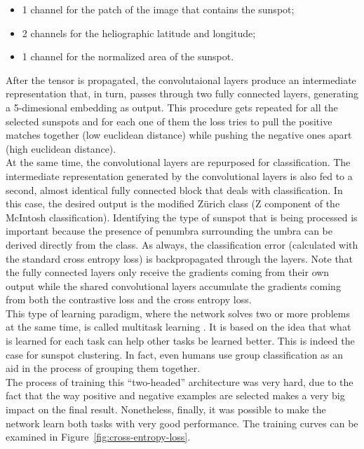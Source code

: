 \begin{itemize}
  \item 1 channel for the patch of the image that contains the sunspot;
  \item 2 channels for the heliographic latitude and longitude;
  \item 1 channel for the normalized area of the sunspot.
\end{itemize}
After the tensor is propagated, the convolutaional layers produce an intermediate representation that, in turn, passes through two fully connected layers, generating a 5-dimesional embedding as output. This procedure gets repeated for all the selected sunspots and for each one of them the loss tries to pull the positive matches together (low euclidean distance) while pushing the negative ones apart (high euclidean distance).\\
At the same time, the convolutional layers are repurposed for classification. The intermediate representation generated by the convolutional layers is also fed to a second, almost identical fully connected block that deals with classification. In this case, the desired output is the modified Z\"{u}rich class (Z component of the McIntosh classification). Identifying the type of sunspot that is being processed is important because the presence of penumbra surrounding the umbra can be derived directly from the class. As always, the classification error (calculated with the standard cross entropy loss) is backpropagated through the layers. Note that the fully connected layers only receive the gradients coming from their own output while the shared convolutional layers accumulate the gradients coming from both the contrastive loss and the cross entropy loss.\\
This type of learning paradigm, where the network solves two or more problems at the same time, is called multitask learning \cite{caruana1997multitask}. It is based on the idea that what is learned for each task can help other tasks be learned better. This is indeed the case for sunspot clustering. In fact, even humans use group classification as an aid in the process of grouping them together.\\
The process of training this ``two-headed'' architecture was very hard, due to the fact that the way positive and negative examples are selected makes a very big impact on the final result. Nonetheless, finally, it was possible to make the network learn both tasks with very good performance. The training curves can be examined in Figure~\ref{fig:cross-entropy-loss}.
